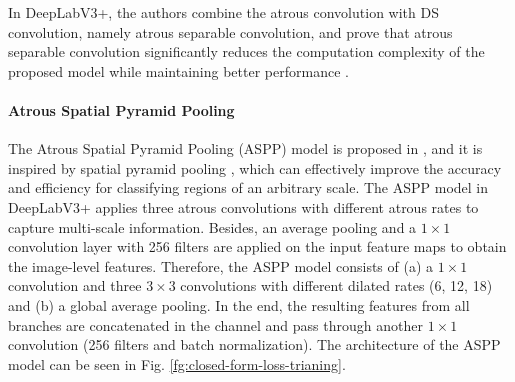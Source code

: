 \documentclass[journal]{IEEEtran}
\begin{document}

In DeepLabV3+, the authors combine the atrous convolution with DS convolution, namely atrous separable convolution, and prove that atrous separable convolution significantly reduces the computation complexity of the proposed model while maintaining better performance \cite{chen2017rethinking}. 

\paragraph{Atrous Spatial Pyramid Pooling}
The Atrous Spatial Pyramid Pooling (ASPP) model is proposed in \cite{chen2017deeplab}, and it is inspired by spatial pyramid pooling \cite{lazebnik2006beyond,he2015spatial}, which can effectively improve the accuracy and efficiency for classifying regions of an arbitrary scale. The ASPP model in DeepLabV3+ applies three atrous convolutions with different atrous rates to capture multi-scale information. Besides, an average pooling and a $1\times 1$ convolution layer with 256 filters are applied on the input feature maps to obtain the image-level features. Therefore, the ASPP model consists of (a) a $1\times 1$ convolution and three $3\times 3$ convolutions with different dilated rates (6, 12, 18) and (b) a global average pooling. In the end, the resulting features from all branches are concatenated in the channel and pass through another $1\times 1$ convolution (256 filters and batch normalization). The architecture of the ASPP model can be seen in Fig. \ref{fg:closed-form-loss-trianing}. 
\end{document}
